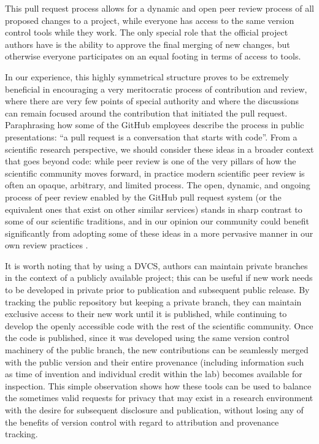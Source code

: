 \documentclass[ChapterTOCs,krantz2]{krantz} %
\begin{document}
This pull request process allows for a dynamic and open peer review process of
all proposed changes to a project, while everyone has access to the same
version control tools while they work.  The only special role that the official
project authors have is the ability to approve the final merging of new
changes, but otherwise everyone participates on an equal footing in terms of
access to tools.  

In our experience, this highly symmetrical structure proves to be extremely
beneficial in encouraging a very meritocratic process of contribution and
review, where there are very few points of special authority and where the
discussions can remain focused around the contribution that initiated the pull
request.  Paraphrasing how some of the GitHub employees describe the process in
public presentations: ``a pull request is a conversation that starts with
code''.  From a scientific research perspective, we should consider these ideas
in a broader context that goes beyond code: while peer review is one of the
very pillars of how the scientific community moves forward, in practice modern
scientific peer review is often an opaque, arbitrary, and limited process.  The
open, dynamic, and ongoing process of peer review enabled by the GitHub pull
request system (or the equivalent ones that exist on other similar services)
stands in sharp contrast to some of our scientific traditions, and in our
opinion our community could benefit significantly from adopting some of these
ideas in a more pervasive manner in our own review practices
\cite{10.3389/fncom.2012.00018}.

It is worth noting that by using a DVCS, authors can maintain private branches
in the context of a publicly available project; this can be useful if new work
needs to be developed in private prior to publication and subsequent public
release. By tracking the public repository but keeping a private branch, they
can maintain exclusive access to their new work until it is published, while
continuing to develop the openly accessible code with the rest of the
scientific community. Once the code is published, since it was developed using
the same version control machinery of the public branch, the new contributions
can be seamlessly merged with the public version and their entire provenance
(including information such as time of invention and individual credit within
the lab) becomes available for inspection.  This simple observation shows how
these tools can be used to balance the sometimes valid requests for privacy
that may exist in a research environment with the desire for subsequent
disclosure and publication, without losing any of the benefits of version
control with regard to attribution and provenance tracking.
\end{document}
